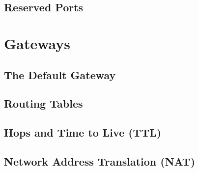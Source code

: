 \documentclass{article}
\begin{document}
\subsection{Reserved Ports}

\section{Gateways}

\subsection{The Default Gateway}

\subsection{Routing Tables}

\subsection{Hops and Time to Live (TTL)}

\subsection{Network Address Translation (NAT)}
\end{document}
